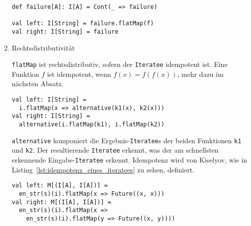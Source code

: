 \begin{enumerate}
    \begin{lstlisting}[caption=Nullelementregel, label=lst:nullelementregel]
def failure[A]: I[A] = Cont(_ => failure)

val left: I[String] = failure.flatMap(f)
val right: I[String] = failure
    \end{lstlisting}

  \item Rechtsdistributivität

    \lstinline|flatMap| ist rechtsdistributiv, sofern der \lstinline|Iteratee| idempotent ist.
    Eine Funktion $f$ ist idempotent, wenn $f(x) = f(f(x))$, mehr dazu im nächsten Absatz.

    \begin{lstlisting}[caption=Rechtsdistributivitätsregel, label=lst:rechtsdistributivitaetsregel]
val left: I[String] =
  i.flatMap(x => alternative(k1(x), k2(x)))
val right: I[String] =
  alternative(i.flatMap(k1), i.flatMap(k2))
    \end{lstlisting}

    \lstinline|alternative| komponiert die Ergebnis-\lstinline|Iteratee|s der beiden Funktionen \lstinline|k1| und \lstinline|k2|.
    Der resultierende \lstinline|Iteratee| erkennt, was der am schnellsten erkennende Eingabe-\lstinline|Iteratee| erkennt.
    Idempotenz wird von Kiselyov, wie in Listing~\ref{lst:idempotenz_eines_iteratees} zu sehen, definiert.

    \begin{lstlisting}[caption=Idempotenz eines Iteratees, label=lst:idempotenz_eines_iteratees]
val left: M[(I[A], I[A])] =
  en_str(s)(i).flatMap(x => Future((x, x)))
val right: M[(I[A], I[A])] =
  en_str(s)(i).flatMap(x =>
    en_str(s)(i).flatMap(y => Future((x, y))))
    \end{lstlisting}
\end{enumerate}





